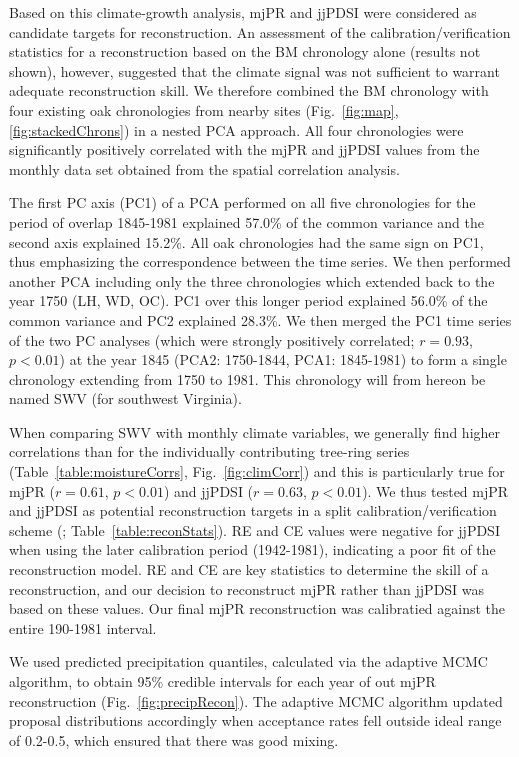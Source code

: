 Based on this climate-growth analysis, mjPR and jjPDSI were considered
as candidate targets for reconstruction. An assessment of the
calibration/verification statistics for a reconstruction based on the BM
chronology alone (results not shown), however, suggested that the climate
signal was not sufficient to warrant adequate reconstruction skill. We
therefore combined the BM chronology with four existing oak chronologies
from nearby sites (Fig.~\ref{fig:map}, \ref{fig:stackedChrons}) in a
nested PCA approach. All four chronologies were significantly positively
correlated with the mjPR and jjPDSI values from the monthly data set
obtained from the spatial correlation analysis.

The first PC axis (PC1) of a PCA performed on all five chronologies
for the period of overlap 1845-1981 explained 57.0\% of the common
variance and the second axis explained 15.2\%. All oak chronologies had
the same sign on PC1, thus emphasizing the correspondence between the
time series. We then performed another PCA including only the three
chronologies which extended back to the year 1750 (LH, WD, OC). PC1
over this longer period explained 56.0\% of the common variance and
PC2 explained 28.3\%. We then merged the PC1 time series of the two PC
analyses (which were strongly positively correlated; $r=0.93$, $p <
0.01$) at the year 1845 (PCA2: 1750-1844, PCA1: 1845-1981) to form a
single chronology extending from 1750 to 1981. This chronology will from
hereon be named SWV (for southwest Virginia).

When comparing SWV with monthly climate variables, we generally find
higher correlations than for the individually contributing tree-ring
series (Table~\ref{table:moistureCorrs}, Fig.~\ref{fig:climCorr}) and
this is particularly true for mjPR ($r=0.61$, $p<0.01$) and jjPDSI
($r=0.63$, $p<0.01$). We thus tested mjPR and jjPDSI as potential
reconstruction targets in a split calibration/verification scheme
(\cite{fritts1990methods}; Table~\ref{table:reconStats}). RE and CE
values were negative for jjPDSI when using the later calibration period
(1942-1981), indicating a poor fit of the reconstruction model. RE and
CE are key statistics to determine the skill of a reconstruction, and
our decision to reconstruct mjPR rather than jjPDSI was based on these
values. Our final mjPR reconstruction was calibratied against the entire
190-1981 interval.

We used predicted precipitation quantiles, calculated via the adaptive
MCMC algorithm, to obtain 95\% credible intervals for each year of out
mjPR reconstruction (Fig.~\ref{fig:precipRecon}). The adaptive MCMC
algorithm updated proposal distributions accordingly when acceptance
rates fell outside ideal range of 0.2-0.5, which ensured that there was
good mixing.

